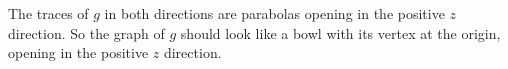 \begin{activitySolution}
\begin{center}
\end{center}
\item The traces of $g$ in both directions are parabolas opening in the positive $z$ direction. So the graph of $g$ should look like a bowl with its vertex at the origin, opening in the positive $z$ direction. 
\ea
\end{activitySolution}
\aftera 